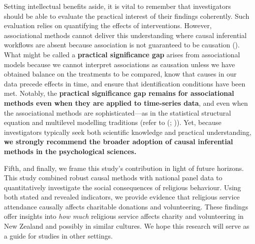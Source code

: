 \documentclass[
  single column]{article}
\begin{document}
Setting intellectual benefits aside, it is vital to remember that
investigators should be able to evaluate the practical interest of their
findings coherently. Such evaluation relies on quantifying the effects
of interventions. However, associational methods cannot deliver this
understanding where causal inferential workflows are absent because
association is not guaranteed to be causation
(). What might
be called a \textbf{practical significance gap} arises from
associational models because we cannot interpret associations as
causation unless we have obtained balance on the treatments to be
compared, know that causes in our data precede effects in time, and
ensure that identification conditions have been met. Notably, the
\textbf{practical significance gap remains for associational methods
even when they are applied to time-series data}, and even when the
associational methods are sophisticated---as in the statistical
structural equation and multilevel modelling traditions (refer to
(;
)). Yet, because
investigators typically seek both scientific knowledge and practical
understanding, \textbf{we strongly recommend the broader adoption of
causal inferential methods in the psychological sciences.}

Fifth, and finally, we frame this study's contribution in light of
future horizons. This study combined robust causal methods with national
panel data to quantitatively investigate the social consequences of
religious behaviour. Using both stated and revealed indicators, we
provide evidence that religious service attendance causally affects
charitable donations and volunteering. These findings offer insights
into \emph{how much} religious service affects charity and volunteering
in New Zealand and possibly in similar cultures. We hope this research
will serve as a guide for studies in other settings.
\end{document}
